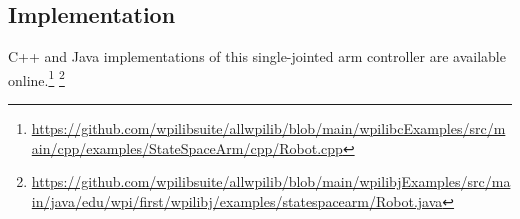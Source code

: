 \subsection{Implementation}

C++ and Java implementations of this single-jointed arm controller are available
online.\footnote{\url{https://github.com/wpilibsuite/allwpilib/blob/main/wpilibcExamples/src/main/cpp/examples/StateSpaceArm/cpp/Robot.cpp}}%
\footnote{\url{https://github.com/wpilibsuite/allwpilib/blob/main/wpilibjExamples/src/main/java/edu/wpi/first/wpilibj/examples/statespacearm/Robot.java}}
